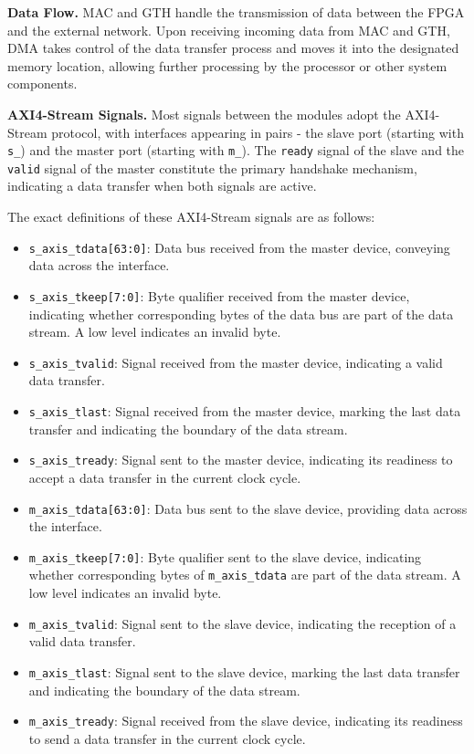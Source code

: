 \textbf{Data Flow.} MAC and GTH handle the transmission of data between the FPGA and the external network. Upon receiving incoming data from MAC and GTH, DMA takes control of the data transfer process and moves it into the designated memory location, allowing further processing by the processor or other system components.

\textbf{AXI4-Stream Signals.} Most signals between the modules adopt the AXI4-Stream protocol, with interfaces appearing in pairs - the slave port (starting with \verb|s_|) and the master port (starting with \verb|m_|). The \verb|ready| signal of the slave and the \verb|valid| signal of the master constitute the primary handshake mechanism, indicating a data transfer when both signals are active.

The exact definitions of these AXI4-Stream signals are as follows:

\begin{itemize}
    \item \verb|s_axis_tdata[63:0]|: Data bus received from the master device, conveying data across the interface.
    \item \verb|s_axis_tkeep[7:0]|: Byte qualifier received from the master device, indicating whether corresponding bytes of the data bus are part of the data stream. A low level indicates an invalid byte.
    \item \verb|s_axis_tvalid|: Signal received from the master device, indicating a valid data transfer.
    \item \verb|s_axis_tlast|: Signal received from the master device, marking the last data transfer and indicating the boundary of the data stream.
    \item \verb|s_axis_tready|: Signal sent to the master device, indicating its readiness to accept a data transfer in the current clock cycle.
    \item \verb|m_axis_tdata[63:0]|: Data bus sent to the slave device, providing data across the interface.
    \item \verb|m_axis_tkeep[7:0]|: Byte qualifier sent to the slave device, indicating whether corresponding bytes of \verb|m_axis_tdata| are part of the data stream. A low level indicates an invalid byte.
    \item \verb|m_axis_tvalid|: Signal sent to the slave device, indicating the reception of a valid data transfer.
    \item \verb|m_axis_tlast|: Signal sent to the slave device, marking the last data transfer and indicating the boundary of the data stream.
    \item \verb|m_axis_tready|: Signal received from the slave device, indicating its readiness to send a data transfer in the current clock cycle.
\end{itemize}

